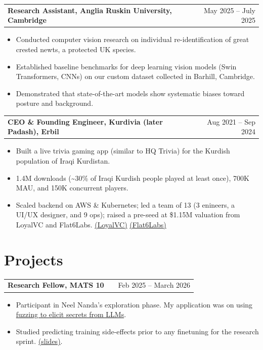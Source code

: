 \documentclass[a4paper,12pt]{article}
\makeatletter
\newenvironment{joblong}[2]
    {
    \begin{tabularx}{\linewidth}{@{}l X r@{}}
    \textbf{#1} & \hfill &  #2 \\[3.75pt]
    \end{tabularx}
    \begin{minipage}[t]{\linewidth}
    \begin{itemize}[nosep,after=\strut, leftmargin=1em, itemsep=3pt,label=--]
    }
    {
    \end{itemize}
    \end{minipage}    
    }
\makeatother
\begin{document}
\begin{joblong}{Research Assistant, Anglia Ruskin University, Cambridge}{May 2025 -- July 2025}

\item Conducted computer vision research on individual re-identification of great crested newts, a protected UK species.
\item Established baseline benchmarks for deep learning vision models (Swin Transformers, CNNs) on our custom dataset collected in Barhill, Cambridge.
\item Demonstrated that state-of-the-art models show systematic biases toward posture and background.

\end{joblong}

\begin{joblong}{CEO \& Founding Engineer, Kurdivia (later Padash), Erbil}{Aug 2021 -- Sep 2024}
\item Built a live trivia gaming app (similar to HQ Trivia) for the Kurdish population of Iraqi Kurdistan.
\item 1.4M downloads (\textasciitilde30\% of Iraqi Kurdish people played at least once), 700K MAU, and 150K concurrent players.
\item Scaled backend on AWS \& Kubernetes; led a team of 13 (3 enineers, a UI/UX designer, and 9 ops); raised a pre-seed at \$1.15M valuation from LoyalVC and Flat6Labs. \href{https://www.loyal.vc/portfolio/padash}{(LoyalVC)} \href{https://www.flat6labs.com/Company/padash/}{(Flat6Labs)}
\end{joblong}


\section{Projects}


\begin{joblong}{Research Fellow, MATS 10}{Feb 2025 -- March 2026}

\item Participant in Neel Nanda's exploration phase. My application was on using \href{https://docs.google.com/document/d/1tSvYjPoSsTlqQHLGw_6yTE75XG0HlhDrYFMUWBBFybU/edit?tab=t.0#heading=h.svoh91ias2y7}{fuzzing to elicit secrets from LLMs}.
\item Studied predicting training side-effects prior to any finetuning for the research sprint. \href{https://docs.google.com/presentation/d/1QBw1AKbvHidJ2vwtVnFKUK5mQmkKuodeJ8YRqNM7M9w/edit}{(slides)}.

\end{joblong}
\end{document}
